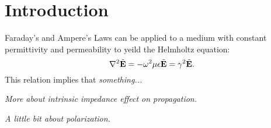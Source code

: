 \section{Introduction}\label{sec:intro}
Faraday's and Ampere's Laws can be applied \cite[pp. 15-16]{lab-manual} to a medium with constant permittivity and permeability to yeild the Helmholtz equation:
\begin{equation}
	\nabla^2 \tilde{\mathbf{E}} = - \omega^2 \mu \epsilon \tilde{\mathbf{E}} = \gamma^2 \tilde{\mathbf{E}}.
\end{equation}
This relation implies that \emph{something...}

\textit{More about intrinsic impedance effect on propagation.}

\textit{A little bit about polarization.}
